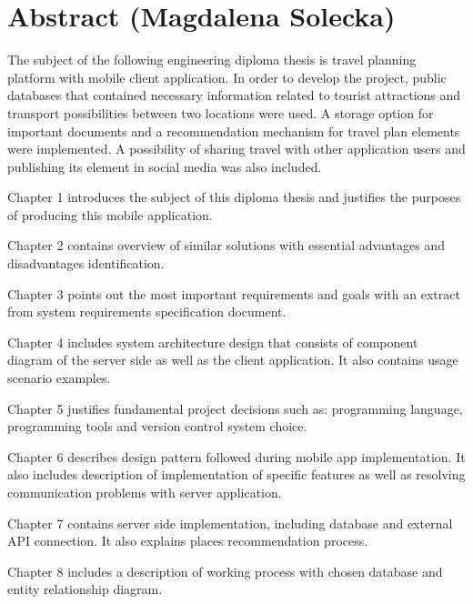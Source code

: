 \chapter*{Abstract (Magdalena Solecka)}
\par The subject of the following engineering diploma thesis is travel planning 
platform with mobile client application. In order to develop the project, public 
databases that contained necessary information related to tourist attractions and 
transport possibilities between two locations were used. A storage option for important 
documents and a recommendation mechanism for travel plan elements were implemented. 
A possibility of sharing travel with other application users and publishing its element 
in social media was also included.
 
\par Chapter 1 introduces the subject of this diploma thesis and justifies the purposes 
of producing this mobile application. 
 
\par Chapter 2 contains overview of similar solutions with essential advantages and 
disadvantages identification.

\par Chapter 3 points out the most important requirements and goals with an extract from 
system requirements specification document.

\par Chapter 4 includes system architecture design that consists of component diagram of 
the server side as well as the client application. It also contains usage scenario 
examples.

\par Chapter 5 justifies fundamental project decisions such as: programming language, 
programming tools and version control system choice.

\par Chapter 6 describes design pattern followed during mobile app implementation. It 
also includes description of implementation of specific features as well as resolving 
communication problems with server application.

\par Chapter 7 contains server side implementation, including database and external API connection.
It also explains places recommendation process. 

\par Chapter 8 includes a description of working process with chosen database and entity 
relationship diagram.

